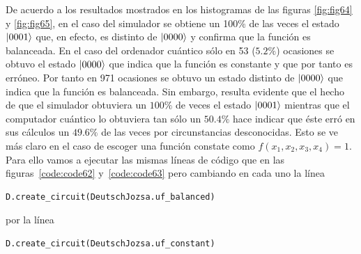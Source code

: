 De acuerdo a los resultados mostrados en los histogramas de las figuras \ref{fig:fig64} y \ref{fig:fig65}, en el caso del simulador se obtiene un 100\% de las veces el estado $\left|0001\right\rangle$ que, en efecto, es distinto de $\left|0000\right\rangle$ y confirma que la función es balanceada. En el caso del ordenador cuántico sólo en 53 ($5.2\%$) ocasiones se obtuvo el estado $\left|0000\right\rangle$ que indica que la función es constante y que por tanto es erróneo. Por tanto en 971 ocasiones se obtuvo un estado distinto de $\left|0000\right\rangle$ que indica que la función es balanceada. Sin embargo, resulta evidente que el hecho de que el simulador obtuviera un $100\%$ de veces el estado $\left|0001\right\rangle$ mientras que el computador cuántico lo obtuviera tan sólo un $50.4\%$ hace indicar que éste erró en sus cálculos un $49.6\%$ de las veces por circunstancias desconocidas. Esto se ve más claro en el caso de escoger una función constate como $f(x_1,x_2,x_3,x_4)=1$. Para ello vamos a ejecutar las mismas líneas de código que en las figuras~\ref{code:code62} y~\ref{code:code63} pero cambiando en cada uno la línea
\begin{lstlisting}[language=Python]
D.create_circuit(DeutschJozsa.uf_balanced)
\end{lstlisting}
por la línea
\begin{lstlisting}[language=Python]
D.create_circuit(DeutschJozsa.uf_constant)
\end{lstlisting}

